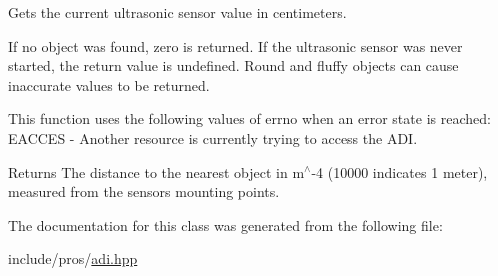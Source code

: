 Gets the current ultrasonic sensor value in centimeters. 

If no object was found, zero is returned. If the ultrasonic sensor was never started, the return value is undefined. Round and fluffy objects can cause inaccurate values to be returned.

This function uses the following values of errno when an error state is reached\+: E\+A\+C\+C\+ES -\/ Another resource is currently trying to access the A\+DI.

\begin{DoxyReturn}{Returns}
The distance to the nearest object in m$^\wedge$-\/4 (10000 indicates 1 meter), measured from the sensor\textquotesingle{}s mounting points. 
\end{DoxyReturn}


The documentation for this class was generated from the following file\+:\begin{DoxyCompactItemize}
\item 
include/pros/\mbox{\hyperlink{adi_8hpp}{adi.\+hpp}}\end{DoxyCompactItemize}
